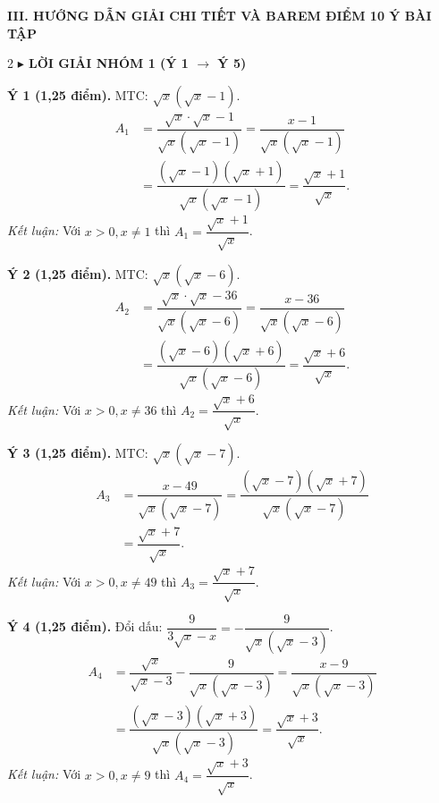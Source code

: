 \documentclass[12pt,a4paper]{article}
\begin{document}
\newpage
\begin{center}
  {\bfseries\large\color{mainblue} III. HƯỚNG DẪN GIẢI CHI TIẾT VÀ BAREM ĐIỂM 10 Ý BÀI TẬP}
\end{center}

\vspace{-1.5mm}
\noindent{\color{mainblue}\rule{\linewidth}{1.0pt}}
\vspace{1.0mm}

\begingroup
\small
\begin{multicols}{2}
\noindent\textbf{\color{accentred}$\blacktriangleright$ LỜI GIẢI NHÓM 1 (Ý 1 $\to$ Ý 5)}
\vspace{1mm}

\noindent\textbf{Ý 1 (1,25 điểm).} MTC: $\sqrt{x}(\sqrt{x}-1)$.
\begin{align*}
A_1 &= \dfrac{\sqrt{x} \cdot \sqrt{x} - 1}{\sqrt{x}(\sqrt{x}-1)} = \dfrac{x - 1}{\sqrt{x}(\sqrt{x}-1)} \\
&= \dfrac{(\sqrt{x}-1)(\sqrt{x}+1)}{\sqrt{x}(\sqrt{x}-1)} = \dfrac{\sqrt{x}+1}{\sqrt{x}}.
\end{align*}
\textit{Kết luận:} Với $x > 0, x \ne 1$ thì $A_1 = \dfrac{\sqrt{x}+1}{\sqrt{x}}$.

\vspace{1mm}
\noindent\textbf{Ý 2 (1,25 điểm).} MTC: $\sqrt{x}(\sqrt{x}-6)$.
\begin{align*}
A_2 &= \dfrac{\sqrt{x} \cdot \sqrt{x} - 36}{\sqrt{x}(\sqrt{x}-6)} = \dfrac{x - 36}{\sqrt{x}(\sqrt{x}-6)} \\
&= \dfrac{(\sqrt{x}-6)(\sqrt{x}+6)}{\sqrt{x}(\sqrt{x}-6)} = \dfrac{\sqrt{x}+6}{\sqrt{x}}.
\end{align*}
\textit{Kết luận:} Với $x > 0, x \ne 36$ thì $A_2 = \dfrac{\sqrt{x}+6}{\sqrt{x}}$.

\vspace{1mm}
\noindent\textbf{Ý 3 (1,25 điểm).} MTC: $\sqrt{x}(\sqrt{x}-7)$.
\begin{align*}
A_3 &= \dfrac{x - 49}{\sqrt{x}(\sqrt{x}-7)} = \dfrac{(\sqrt{x}-7)(\sqrt{x}+7)}{\sqrt{x}(\sqrt{x}-7)} \\
&= \dfrac{\sqrt{x}+7}{\sqrt{x}}.
\end{align*}
\textit{Kết luận:} Với $x > 0, x \ne 49$ thì $A_3 = \dfrac{\sqrt{x}+7}{\sqrt{x}}$.

\vspace{1mm}
\noindent\textbf{Ý 4 (1,25 điểm).} Đổi dấu: $\dfrac{9}{3\sqrt{x}-x} = -\dfrac{9}{\sqrt{x}(\sqrt{x}-3)}$.
\begin{align*}
A_4 &= \dfrac{\sqrt{x}}{\sqrt{x}-3} - \dfrac{9}{\sqrt{x}(\sqrt{x}-3)} = \dfrac{x - 9}{\sqrt{x}(\sqrt{x}-3)} \\
&= \dfrac{(\sqrt{x}-3)(\sqrt{x}+3)}{\sqrt{x}(\sqrt{x}-3)} = \dfrac{\sqrt{x}+3}{\sqrt{x}}.
\end{align*}
\textit{Kết luận:} Với $x > 0, x \ne 9$ thì $A_4 = \dfrac{\sqrt{x}+3}{\sqrt{x}}$.


\end{multicols}
\end{document}
